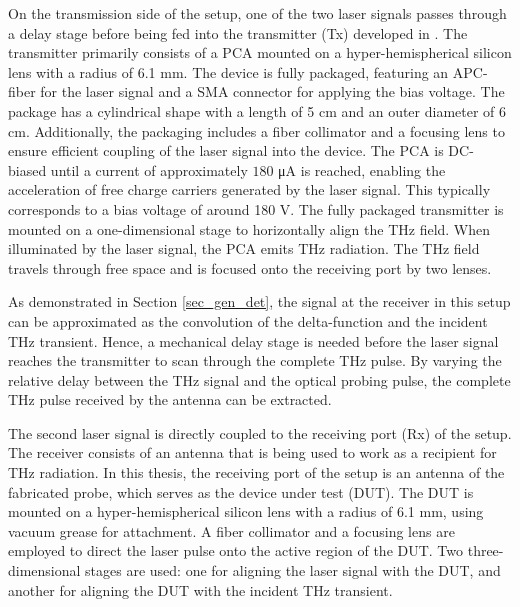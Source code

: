 On the transmission side of the setup, one of the two laser signals passes through a delay stage before being fed into the transmitter (Tx) developed in \cite{nandiErAsInAlGaAsPhotoconductors2021}. The transmitter primarily consists of a PCA mounted on a hyper-hemispherical silicon lens with a radius of \num{6.1} \si{\milli \meter}. The device is fully packaged, featuring an APC-fiber for the laser signal and a SMA connector for applying the bias voltage. The package has a cylindrical shape with a length of \num{5} \si{\centi \meter} and an outer diameter of \num{6} \si{\centi \meter}. Additionally, the packaging includes a fiber collimator and a focusing lens to ensure efficient coupling of the laser signal into the device. The PCA is DC-biased until a current of approximately $180$ \si{\micro \ampere} is reached, enabling the acceleration of free charge carriers generated by the laser signal. This typically corresponds to a bias voltage of around \num{180} \si{\volt}. The fully packaged transmitter is mounted on a one-dimensional stage to horizontally align the THz field. When illuminated by the laser signal, the PCA emits THz radiation. The THz field travels through free space and is focused onto the receiving port by two lenses.  

As demonstrated in Section \ref{sec_gen_det}, the signal at the receiver in this setup can be approximated as the convolution of the delta-function and the incident THz transient. Hence, a mechanical delay stage is needed before the laser signal reaches the transmitter to scan through the complete THz pulse. By varying the relative delay between the THz signal and the optical probing pulse, the complete THz pulse received by the antenna can be extracted. 

The second laser signal is directly coupled to the receiving port (Rx) of the setup. The receiver consists of an antenna that is being used to work as a recipient for THz radiation.  In this thesis, the receiving port of the setup is an antenna of the fabricated probe, which serves as the device under test (DUT). The DUT is mounted on a hyper-hemispherical silicon lens with a radius of \num{6.1} \si{\milli \meter}, using vacuum grease for attachment. A fiber collimator and a focusing lens are employed to direct the laser pulse onto the active region of the DUT. Two three-dimensional stages are used: one for aligning the laser signal with the DUT, and another for aligning the DUT with the incident THz transient.

